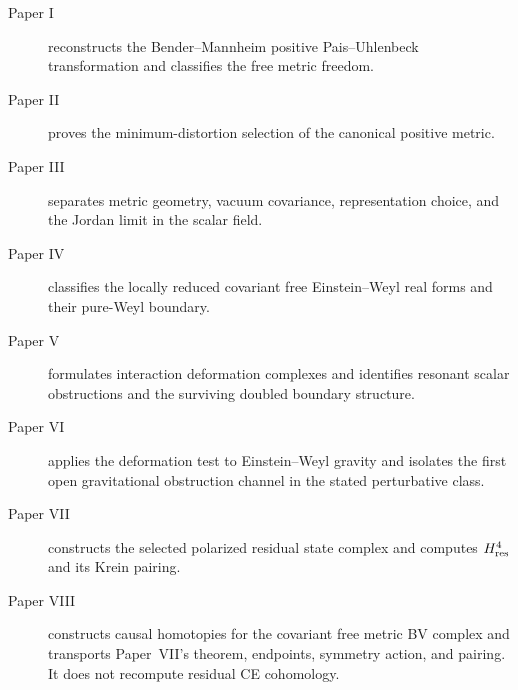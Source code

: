 \documentclass[11pt]{article}
\theoremstyle{remark}
\begin{document}
\begin{description}
\item[Paper I] \cite{paperI} reconstructs the Bender--Mannheim positive
Pais--Uhlenbeck transformation and classifies the free metric freedom.
\item[Paper II] \cite{paperII} proves the minimum-distortion selection of
the canonical positive metric.
\item[Paper III] \cite{paperIII} separates metric geometry, vacuum
covariance, representation choice, and the Jordan limit in the scalar field.
\item[Paper IV] \cite{paperIV} classifies the locally reduced covariant free
Einstein--Weyl real forms and their pure-Weyl boundary.
\item[Paper V] \cite{paperV} formulates interaction deformation complexes
and identifies resonant scalar obstructions and the surviving doubled
boundary structure.
\item[Paper VI] \cite{paperVI} applies the deformation test to
Einstein--Weyl gravity and isolates the first open gravitational obstruction
channel in the stated perturbative class.
\item[Paper VII] \cite{paperVII} constructs the selected polarized residual
state complex and computes $H^4_{\rm res}$ and its Krein pairing.
\item[Paper VIII] \cite{paperVIII} constructs causal homotopies for the
covariant free metric BV complex and transports Paper~VII's theorem,
endpoints, symmetry action, and pairing.  It does not recompute residual CE
cohomology.
\end{description}
\end{document}
